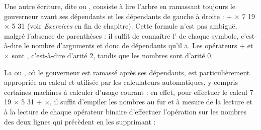 {    Une autre écriture, dite  ou , consiste à lire l’arbre en ramassant toujours le gouverneur avant ses dépendants et les dépendants de gauche à droite : + \textrm{${\times}$} 7 19 \textrm{${\times}$} 5 31 (voir \textit{Exercices} en fin de chapitre). Cette formule n’est pas ambiguë, malgré l’absence de parenthèses : il suffit de connaître l’ de chaque symbole, c’est-à-dire le nombre d’arguments et donc de dépendants qu’il a. Les opérateurs + et \textrm{${\times}$} sont , c’est-à-dire d’arité 2, tandis que les nombres sont d’arité 0.

    La \textstyleTermes{}  ou , où le gouverneur est ramassé après ses dépendants, est particulièrement appropriée au calcul et utilisée par les calculateurs automatiques, y compris certaines machines à calculer d’usage courant : en effet, pour effectuer le calcul 7 19 \textrm{${\times}$} 5 31 + \textrm{${\times}$}, il suffit d’empiler les nombres au fur et à mesure de la lecture et à la lecture de chaque opérateur binaire d’effectuer l’opération sur les nombres des deux lignes qui précèdent en les supprimant :

    \ea
    \z

}
